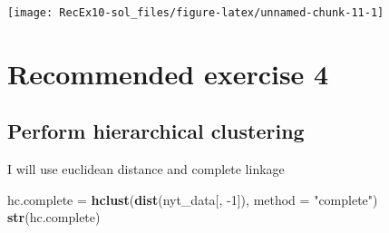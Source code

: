 \documentclass[]{article}
\newenvironment{Shaded}{\begin{snugshade}}{\end{snugshade}}
\newcommand{\DataTypeTok}[1]{\textcolor[rgb]{0.13,0.29,0.53}{#1}}
\newcommand{\DecValTok}[1]{\textcolor[rgb]{0.00,0.00,0.81}{#1}}
\newcommand{\KeywordTok}[1]{\textcolor[rgb]{0.13,0.29,0.53}{\textbf{#1}}}
\newcommand{\NormalTok}[1]{#1}
\newcommand{\OperatorTok}[1]{\textcolor[rgb]{0.81,0.36,0.00}{\textbf{#1}}}
\newcommand{\StringTok}[1]{\textcolor[rgb]{0.31,0.60,0.02}{#1}}
\begin{document}
\begin{Shaded}
\end{Shaded}

\begin{center}\texttt{[image: RecEx10-sol\_files/figure-latex/unnamed-chunk-11-1]} \end{center}

\hypertarget{recommended-exercise-4}{%
\section{Recommended exercise 4}\label{recommended-exercise-4}}

\hypertarget{perform-hierarchical-clustering}{%
\subsection{Perform hierarchical
clustering}\label{perform-hierarchical-clustering}}

I will use euclidean distance and complete linkage

\begin{Shaded}
\begin{Highlighting}[]
\NormalTok{hc.complete =}\StringTok{ }\KeywordTok{hclust}\NormalTok{(}\KeywordTok{dist}\NormalTok{(nyt_data[, }\DecValTok{-1}\NormalTok{]), }\DataTypeTok{method =} \StringTok{"complete"}\NormalTok{)}
\KeywordTok{str}\NormalTok{(hc.complete)}
\end{Highlighting}
\end{Shaded}
\end{document}
